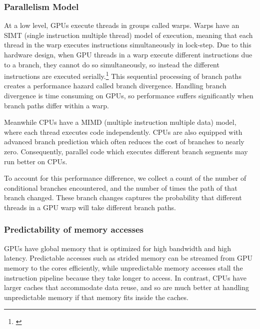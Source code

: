 \documentclass[12pt,twoside]{reedthesis}
\begin{document}
		
		
		\subsubsection{Parallelism Model}
		
		At a low level, GPUs execute threads in groups called warps. Warps have an SIMT (single instruction multiple thread) model of execution, meaning that each thread in the warp executes instructions simultaneously in lock-step. Due to this hardware design, when GPU threads in a warp execute different instructions due to a branch, they cannot do so simultaneously, so instead the different instructions are executed serially.\footnote{\cite{Fung:2007:DWF:1331699.1331735}} This sequential processing of branch paths creates a performance hazard called branch divergence. Handling branch divergence is time consuming on GPUs, so performance suffers significantly when branch paths differ within a warp.
		
		Meanwhile CPUs have a MIMD (multiple instruction multiple data) model, where each thread executes code independently. CPUs are also equipped with advanced branch prediction which often reduces the cost of branches to nearly zero. Consequently, parallel code which executes different branch segments may run better on CPUs. 
		
		To account for this performance difference, we collect a count of the number of conditional branches encountered, and the number of times the path of that branch changed. These branch changes captures the probability that different threads in a GPU warp will take different branch paths. 
		
		\subsubsection{Predictability of memory accesses}
		
		GPUs have global memory that is optimized for high bandwidth and high latency. Predictable accesses such as strided memory can be streamed from GPU memory to the cores efficiently, while unpredictable memory accesses stall the instruction pipeline because they take longer to access. 
		In contrast, CPUs have larger caches that accommodate data reuse, and so are much better at handling unpredictable memory if that memory fits inside the caches. %
		
\end{document}
